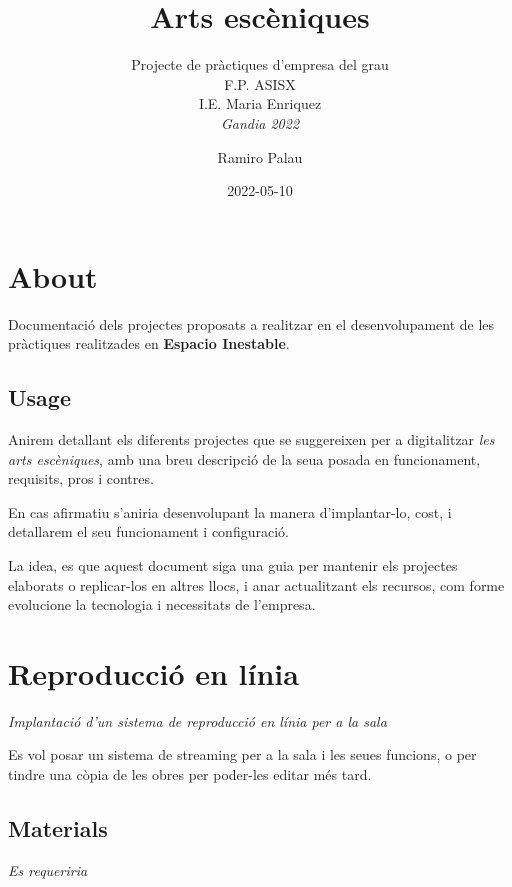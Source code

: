 \documentclass[
  10pt,
]{krantz}
\title{Arts escèniques}
\subtitle{Projecte de pràctiques d'empresa del grau\\
F.P. ASISX\\
I.E. Maria Enriquez\\
\emph{Gandia 2022}}
\author{Ramiro Palau}
\date{2022-05-10}
\begin{document}
\maketitle

{
\hypersetup{linkcolor=}
\setcounter{tocdepth}{2}
\tableofcontents
}
\hypertarget{about}{%
\chapter*{About}\label{about}}


Documentació dels projectes proposats a realitzar en el desenvolupament de les pràctiques realitzades en \textbf{Espacio Inestable}.

\hypertarget{usage}{%
\section*{Usage}\label{usage}}


Anirem detallant els diferents projectes que se suggereixen per a digitalitzar \emph{les arts escèniques}, amb una breu descripció de la seua posada en funcionament, requisits, pros i contres.

En cas afirmatiu s'aniria desenvolupant la manera d'implantar-lo, cost, i detallarem el seu funcionament i configuració.

La idea, es que aquest document siga una guia per mantenir els projectes elaborats o replicar-los en altres llocs, i anar actualitzant els recursos, com forme evolucione la tecnologia i necessitats de l'empresa.

\hypertarget{reproducciuxf3-en-luxednia}{%
\chapter{Reproducció en línia}\label{reproducciuxf3-en-luxednia}}

\emph{Implantació d'un sistema de reproducció en línia per a la sala}

Es vol posar un sistema de streaming per a la sala i les seues funcions, o per tindre una còpia de les obres per poder-les editar més tard.

\hypertarget{materials}{%
\section{Materials}\label{materials}}

\emph{Es requeriria}
\end{document}
